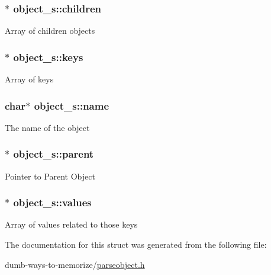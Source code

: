 \subsubsection[{\texorpdfstring{children}{children}}]{$\ast$ object\+\_\+s\+::children}\hypertarget{structobject__s_ae161ef1b6dbb6ac83113daba113056d4}{}\label{structobject__s_ae161ef1b6dbb6ac83113daba113056d4}
Array of children objects 
\subsubsection[{\texorpdfstring{keys}{keys}}]{$\ast$ object\+\_\+s\+::keys}\hypertarget{structobject__s_ae41d32ca81f80b132fab77e1595b8562}{}\label{structobject__s_ae41d32ca81f80b132fab77e1595b8562}
Array of keys 
\subsubsection[{\texorpdfstring{name}{name}}]{\setlength{\rightskip}{0pt plus 5cm}char$\ast$ object\+\_\+s\+::name}\hypertarget{structobject__s_a78e4044696254ef6eded9929ab36382c}{}\label{structobject__s_a78e4044696254ef6eded9929ab36382c}
The name of the object 
\subsubsection[{\texorpdfstring{parent}{parent}}]{$\ast$ object\+\_\+s\+::parent}\hypertarget{structobject__s_af3fcd86c9b596d3d1380af38baf6e200}{}\label{structobject__s_af3fcd86c9b596d3d1380af38baf6e200}
Pointer to Parent Object 
\subsubsection[{\texorpdfstring{values}{values}}]{$\ast$ object\+\_\+s\+::values}\hypertarget{structobject__s_a131fb4eda0dee00a634151e5d7f32184}{}\label{structobject__s_a131fb4eda0dee00a634151e5d7f32184}
Array of values related to those keys 

The documentation for this struct was generated from the following file\+:\begin{DoxyCompactItemize}
\item 
dumb-\/ways-\/to-\/memorize/\hyperlink{parseobject_8h}{parseobject.\+h}\end{DoxyCompactItemize}

